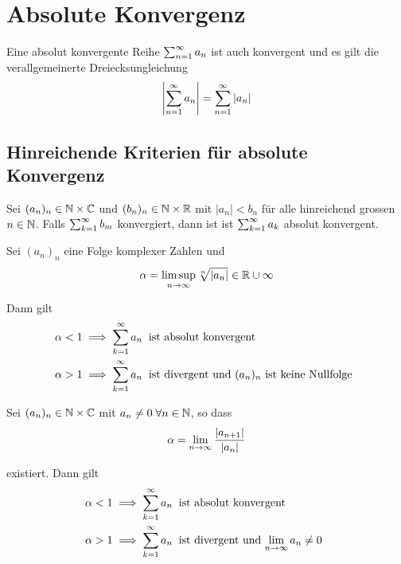 \section{Absolute Konvergenz}

\setcounter{thm}{27}
\begin{thm}
	\label{thm:absolute-konvergenz}
	Eine absolut konvergente Reihe $\sum_{n=1}^{\infty} a_n$ ist auch konvergent und es gilt die verallgemeinerte Dreiecksungleichung
	\begin{equation}
		\left | \sum_{n=1}^{\infty} a_n \right | = \sum_{n=1}^{\infty} | a_n |
	\end{equation}
\end{thm}

\subsection{Hinreichende Kriterien für absolute Konvergenz}

\begin{thm}
	Sei $(a_n)_n \in \mathbb{N} \times \mathbb{C}$ und $(b_n)_n \in \mathbb{N} \times \mathbb{R}$ mit $|a_n| < b_n$ für alle hinreichend grossen $n \in \mathbb{N}$. Falls $\sum_{k=1}^{\infty} b_m$ konvergiert, dann ist ist $\sum_{k=1}^{\infty} a_k$ absolut konvergent.
\end{thm}

\begin{thm}
	
	Sei $(a_n)_n$ eine Folge komplexer Zahlen und
	\begin{equation}
		\alpha = \limsup_{n \to \infty} \sqrt[n]{|a_n|} \in \mathbb{R} \cup \infty
	\end{equation}
	
	Dann gilt
	\begin{equation}
		\begin{aligned}
    	\alpha < 1 &\implies \sum_{k=1}^{\infty} a_n \;\; \text{ist absolut konvergent}\;\; \\
    	\alpha > 1 &\implies \sum_{k=1}^{\infty} a_n \;\; \text{ist divergent und $(a_n)_n$ ist keine Nullfolge}\;\;
		\end{aligned}
	\end{equation}
\end{thm}

\begin{thm}
Sei $(a_n)_n \in \mathbb{N} \times \mathbb{C}$ mit $a_n \neq 0 \; \forall n \in \mathbb{N}$, so dass
\begin{equation}
	\alpha = \lim_{n \to \infty} \frac{|a_{n+1}|}{|a_n|}
\end{equation}

existiert. Dann gilt
\begin{equation}
	\begin{aligned}
		\alpha < 1 &\implies \sum_{k=1}^{\infty} a_n \;\; \text{ist absolut konvergent}\;\; \\
		\alpha > 1 &\implies \sum_{k=1}^{\infty} a_n \;\; \text{ist divergent und $\lim_{n \to \infty} a_n \neq 0$}\;\;
	\end{aligned}
\end{equation}
\end{thm}


